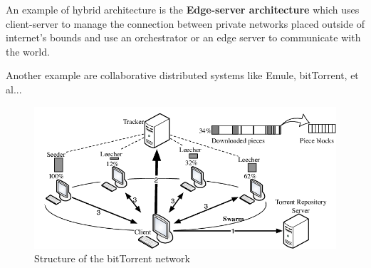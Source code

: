 An example of hybrid architecture is the \textbf{Edge-server architecture} which uses client-server to manage the connection between private networks placed outside of internet's bounds and use an orchestrator or an edge server to communicate with the world.

Another example are collaborative distributed systems like Emule, bitTorrent, et al...
\begin{figure}[htb]
    \centering
    \includegraphics[scale=0.45]{img/bittorrent.png}
    \caption{Structure of the bitTorrent network}
\end{figure}
